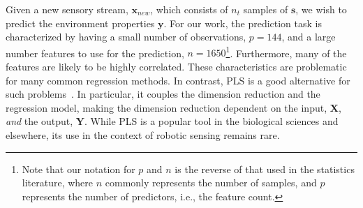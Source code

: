 



Given a new sensory stream, $\mathbf{x}_{new}$, which consists of $n_t$ samples of $\mathbf{s}$, we
wish to predict the environment properties $\mathbf{y}$.  
For our work, the prediction task is characterized by having a small number of observations, $p=    144$, and a large number features to use for the prediction, $n=1650$\footnote{Note that our        notation for $p$ and $n$ is the reverse of that used in the statistics literature, where $n$        commonly represents the number of samples, and $p$ represents the number of predictors, i.e., the   feature count.}.  
Furthermore, many of the features are likely to be highly correlated.  These characteristics are    problematic for many common regression methods. 
In contrast, PLS is a good alternative for such problems~\cite{Friedman2001}. 
In particular, it couples the dimension reduction and the regression model, making the dimension    reduction dependent on the input, $\mathbf{X}$, {\em and} the output, $\mathbf{Y}$.  While PLS is a popular tool in the biological sciences and elsewhere, its use in the context of robotic sensing    remains rare.

